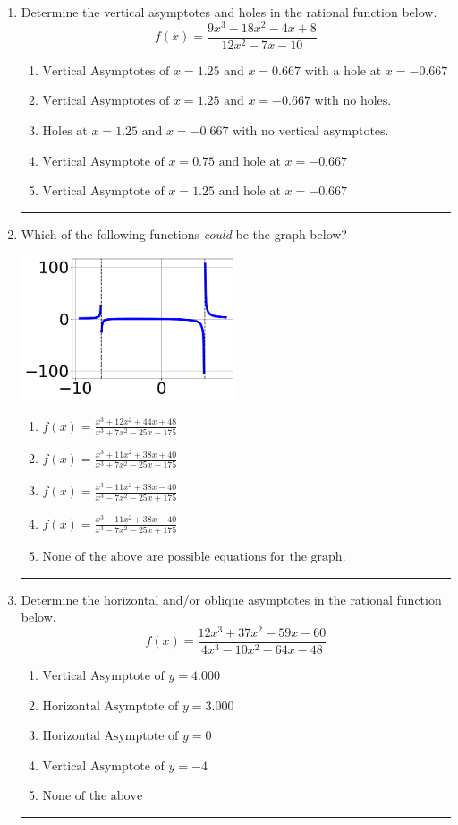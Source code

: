 \documentclass[14pt]{extbook}
\newcommand{\litem}[1]{\item#1\hspace*{-1cm}\rule{\textwidth}{0.4pt}}
\begin{document}
\begin{enumerate}
{\begin{enumerate}[label=\Alph*.]
\end{enumerate} }
\litem{
Determine the vertical asymptotes and holes in the rational function below.\[ f(x) = \frac{9x^{3} -18 x^{2} -4 x + 8}{12x^{2} -7 x -10} \]\begin{enumerate}[label=\Alph*.]
\item \( \text{Vertical Asymptotes of } x = 1.25 \text{ and } x = 0.667 \text{ with a hole at } x = -0.667 \)
\item \( \text{Vertical Asymptotes of } x = 1.25 \text{ and } x = -0.667 \text{ with no holes.} \)
\item \( \text{Holes at } x = 1.25 \text{ and } x = -0.667 \text{ with no vertical asymptotes.} \)
\item \( \text{Vertical Asymptote of } x = 0.75 \text{ and hole at } x = -0.667 \)
\item \( \text{Vertical Asymptote of } x = 1.25 \text{ and hole at } x = -0.667 \)

\end{enumerate} }
\litem{
Which of the following functions \textit{could} be the graph below?
\begin{center}
    \includegraphics[width=0.5\textwidth]{../Figures/identifyGraphOfRationalFunctionB.png}
\end{center}
\begin{enumerate}[label=\Alph*.]
\item \( f(x)=\frac{x^{3} +12 x^{2} +44 x + 48}{x^{3} +7 x^{2} -25 x -175} \)
\item \( f(x)=\frac{x^{3} +11 x^{2} +38 x + 40}{x^{3} +7 x^{2} -25 x -175} \)
\item \( f(x)=\frac{x^{3} -11 x^{2} +38 x -40}{x^{3} -7 x^{2} -25 x + 175} \)
\item \( f(x)=\frac{x^{3} -11 x^{2} +38 x -40}{x^{3} -7 x^{2} -25 x + 175} \)
\item \( \text{None of the above are possible equations for the graph.} \)

\end{enumerate} }
\litem{
Determine the horizontal and/or oblique asymptotes in the rational function below.\[ f(x) = \frac{12x^{3} +37 x^{2} -59 x -60}{4x^{3} -10 x^{2} -64 x -48} \]\begin{enumerate}[label=\Alph*.]
\item \( \text{Vertical Asymptote of } y = 4.000  \)
\item \( \text{Horizontal Asymptote of } y = 3.000  \)
\item \( \text{Horizontal Asymptote of } y = 0  \)
\item \( \text{Vertical Asymptote of } y = -4  \)
\item \( \text{None of the above} \)


\end{enumerate}}
\end{enumerate}
\end{document}
